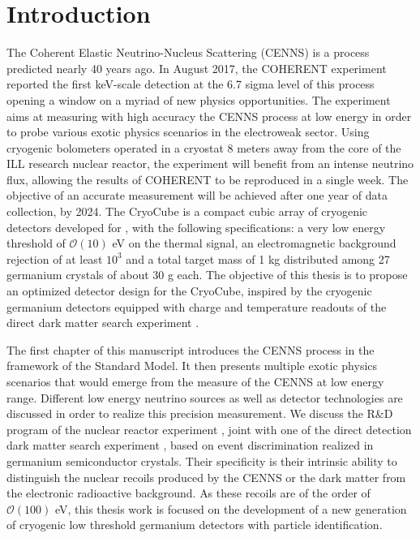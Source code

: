

\chapter{Introduction}
\label{chapterIntroduction} %


The Coherent Elastic Neutrino-Nucleus Scattering (CENNS) is a process predicted nearly 40 years ago. In August 2017, the COHERENT experiment reported the first keV-scale detection at the 6.7 sigma level of this process opening a window on a myriad of new physics opportunities.
The \Ricochet{} experiment aims at measuring with high accuracy the CENNS process at low energy in order to probe various exotic physics scenarios in the electroweak sector. Using cryogenic bolometers operated in a cryostat 8 meters away from the core of the ILL research nuclear reactor, the experiment will benefit from an intense neutrino flux, allowing the results of COHERENT to be reproduced in a single week. The objective of an accurate measurement will be achieved after one year of data collection, by 2024. The CryoCube is a compact cubic array of cryogenic detectors developed for \Ricochet{}, with the following specifications: a very low energy threshold of $\mathcal{O}(10)$ eV on the thermal signal, an electromagnetic background rejection of at least $10^3$ and a total target mass of 1 kg distributed among 27 germanium crystals of about 30 g each.
The objective of this thesis is to propose an optimized detector design for the CryoCube, inspired by the cryogenic germanium detectors equipped with charge and temperature readouts of the direct dark matter search experiment \Edelweiss{}. 

The first chapter of this manuscript introduces the CENNS process in the framework of the Standard Model. It then presents multiple exotic physics scenarios that would emerge from the measure of the CENNS at low energy range. Different low energy neutrino sources as well as detector technologies are discussed in order to realize this precision measurement. We discuss the R\&D program of the nuclear reactor experiment \Ricochet{}, joint with one of the direct detection dark matter search experiment \Edelweiss{}, based on event discrimination realized in germanium semiconductor crystals. Their specificity is their intrinsic ability to distinguish the nuclear recoils produced by the CENNS or the dark matter from the electronic radioactive background. As these recoils are of the order of $\mathcal{O}(100)$ eV, this thesis work is focused on the development of a new generation of cryogenic low threshold germanium detectors with particle identification.
 
